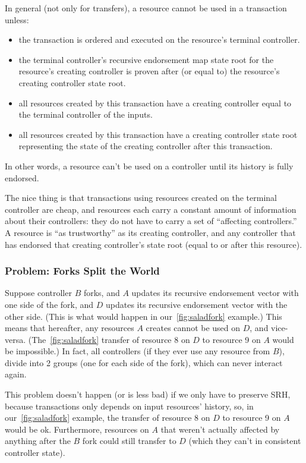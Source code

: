 \documentclass[a4paper,USenglish,cleveref, autoref, thm-restate, anonymous]{lipics-v2021}
\begin{document}
In general (not only for transfers), a resource cannot be used in a transaction unless:
\begin{itemize}
    \item the transaction is ordered and executed on the resource's terminal controller.
    \item the terminal controller's recursive endorsement map state root for the resource's creating controller is proven after (or equal to) the resource's creating controller state root.
    \item all resources created by this transaction have a creating controller equal to the terminal controller of the inputs. 
    \item all resources created by this transaction have a creating controller state root representing the state of the creating controller after this transaction.
\end{itemize}
In other words, a resource can't be used on a controller until its history is fully endorsed. 

The nice thing is that transactions using resources created on the terminal controller are cheap, and resources each carry a constant amount of information about their controllers: they do not have to carry a set of ``affecting controllers.''
A resource is ``as trustworthy'' as its creating controller, and any controller that has endorsed that creating controller's state root (equal to or after this resource).


\subsubsection{Problem: Forks Split the World}
Suppose controller $B$ forks, and $A$ updates its recursive endorsement vector with one side of the fork, and $D$ updates its recursive endorsement vector with the other side. 
(This is what would happen in our~\cref{fig:saladfork} example.)
This means that hereafter, any resources $A$ creates cannot be used on $D$, and vice-versa. 
(The~\cref{fig:saladfork} transfer of resource 8 on $D$ to resource 9 on $A$ would be impossible.)
In fact, all controllers (if they ever use any resource from $B$), divide into 2 groups (one for each side of the fork), which can never interact again. 

This problem doesn't happen (or is less bad) if we only have to preserve SRH, because transactions only depends on input resources' history, so, in our~\cref{fig:saladfork} example, the transfer of resource 8 on $D$ to resource 9 on $A$ would be ok.
Furthermore, resources on $A$ that weren't actually affected by anything after the $B$ fork could still transfer to $D$ (which they can't in consistent controller state). 
\end{document}
